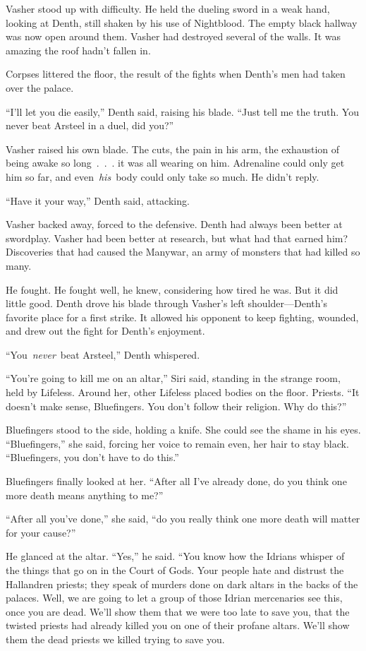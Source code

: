 Vasher stood up with difficulty. He held the dueling sword in a weak hand, looking at Denth, still shaken by his use of Nightblood. The empty black hallway was now open around them. Vasher had destroyed several of the walls. It was amazing the roof hadn’t fallen in.

Corpses littered the floor, the result of the fights when Denth’s men had taken over the palace.

“I’ll let you die easily,” Denth said, raising his blade. “Just tell me the truth. You never beat Arsteel in a duel, did you?”

Vasher raised his own blade. The cuts, the pain in his arm, the exhaustion of being awake so long~.~.~. it was all wearing on him. Adrenaline could only get him so far, and even~\textit{his}~body could only take so much. He didn’t reply.

“Have it your way,” Denth said, attacking.

Vasher backed away, forced to the defensive. Denth had always been better at swordplay. Vasher had been better at research, but what had that earned him? Discoveries that had caused the Manywar, an army of monsters that had killed so many.

He fought. He fought well, he knew, considering how tired he was. But it did little good. Denth drove his blade through Vasher’s left shoulder—Denth’s favorite place for a first strike. It allowed his opponent to keep fighting, wounded, and drew out the fight for Denth’s enjoyment.

“You~\textit{never}~beat Arsteel,” Denth whispered.

\orn

“You’re going to kill me on an altar,” Siri said, standing in the strange room, held by Lifeless. Around her, other Lifeless placed bodies on the floor. Priests. “It doesn’t make sense, Bluefingers. You don’t follow their religion. Why do this?”

Bluefingers stood to the side, holding a knife. She could see the shame in his eyes. “Bluefingers,” she said, forcing her voice to remain even, her hair to stay black. “Bluefingers, you don’t have to do this.”

Bluefingers finally looked at her. “After all I’ve already done, do you think one more death means anything to me?”

“After all you’ve done,” she said, “do you really think one more death will matter for your cause?”

He glanced at the altar. “Yes,” he said. “You know how the Idrians whisper of the things that go on in the Court of Gods. Your people hate and distrust the Hallandren priests; they speak of murders done on dark altars in the backs of the palaces. Well, we are going to let a group of those Idrian mercenaries see this, once you are dead. We’ll show them that we were too late to save you, that the twisted priests had already killed you on one of their profane altars. We’ll show them the dead priests we killed trying to save you.

